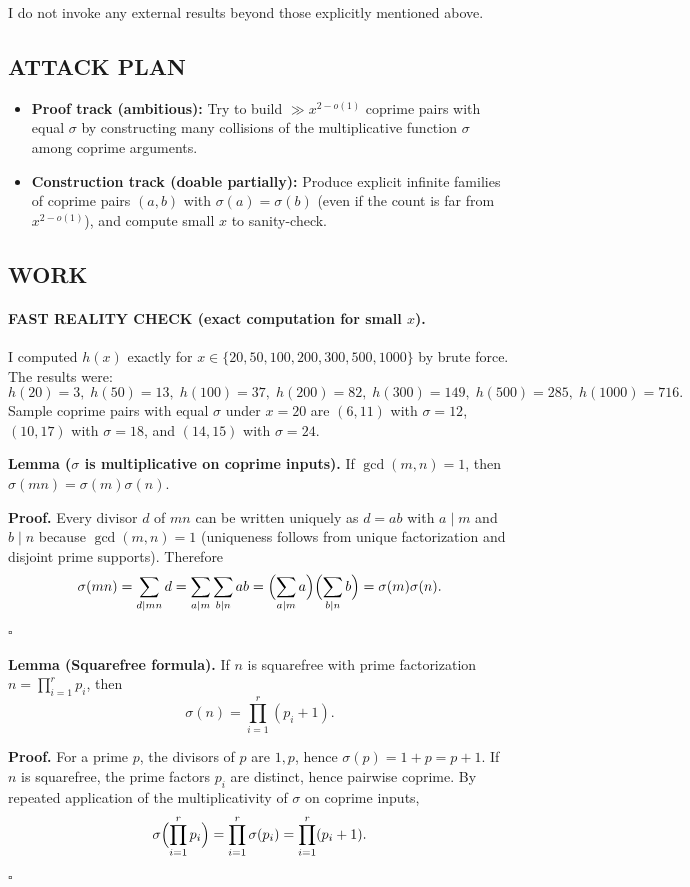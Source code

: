 I do not invoke any external results beyond those explicitly mentioned above.

\subsection*{ATTACK PLAN}
\begin{itemize}
\item \textbf{Proof track (ambitious):} Try to build $\gg x^{2-o(1)}$ coprime pairs with equal $\sigma$ by constructing many collisions of the multiplicative function $\sigma$ among coprime arguments.
\item \textbf{Construction track (doable partially):} Produce explicit infinite families of coprime pairs $(a,b)$ with $\sigma(a)=\sigma(b)$ (even if the count is far from $x^{2-o(1)}$), and compute small $x$ to sanity-check.
\end{itemize}

\subsection*{WORK}
\paragraph{FAST REALITY CHECK (exact computation for small $x$).}
I computed $h(x)$ exactly for $x\in\{20,50,100,200,300,500,1000\}$ by brute force. The results were:
\[
 h(20)=3,\; h(50)=13,\; h(100)=37,\; h(200)=82,\; h(300)=149,\; h(500)=285,\; h(1000)=716.
\]
Sample coprime pairs with equal $\sigma$ under $x=20$ are $(6,11)$ with $\sigma=12$, $(10,17)$ with $\sigma=18$, and $(14,15)$ with $\sigma=24$.

\noindent\textbf{Lemma ($\sigma$ is multiplicative on coprime inputs).}
If $\gcd(m,n)=1$, then $\sigma(mn)=\sigma(m)\sigma(n)$.

\noindent\textbf{Proof.}
Every divisor $d$ of $mn$ can be written uniquely as $d=ab$ with $a\mid m$ and $b\mid n$ because $\gcd(m,n)=1$ (uniqueness follows from unique factorization and disjoint prime supports). Therefore
\[
\sigma(mn)=\sum_{d\mid mn} d = \sum_{a\mid m}\sum_{b\mid n} ab = \Bigl(\sum_{a\mid m} a\Bigr)\Bigl(\sum_{b\mid n} b\Bigr)=\sigma(m)\sigma(n).
\]
\hfill$\square$


\noindent\textbf{Lemma (Squarefree formula).}
If $n$ is squarefree with prime factorization $n=\prod_{i=1}^r p_i$, then
\[
\sigma(n)=\prod_{i=1}^r (p_i+1).
\]

\noindent\textbf{Proof.}
For a prime $p$, the divisors of $p$ are $1,p$, hence $\sigma(p)=1+p=p+1$.
If $n$ is squarefree, the prime factors $p_i$ are distinct, hence pairwise coprime. By repeated application of the multiplicativity of $\sigma$ on coprime inputs,
\[
\sigma\Bigl(\prod_{i=1}^r p_i\Bigr)=\prod_{i=1}^r \sigma(p_i)=\prod_{i=1}^r (p_i+1).
\]
\hfill$\square$


